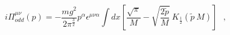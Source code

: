 \begin{equation}
i\Pi^{\mu\nu}_{odd}(p) =  -\frac {mg^2}{2 \pi^{\frac {3}{2} } } p^{\alpha}
\epsilon^{\mu \nu \alpha} \int dx [ \frac {\sqrt {\pi}}{M} - \sqrt {\frac 
{2\tilde p}{M} }~{\mathit {K}}_{\frac {1}{2}}(\tilde p~M) ] ~~~,
\end{equation}

